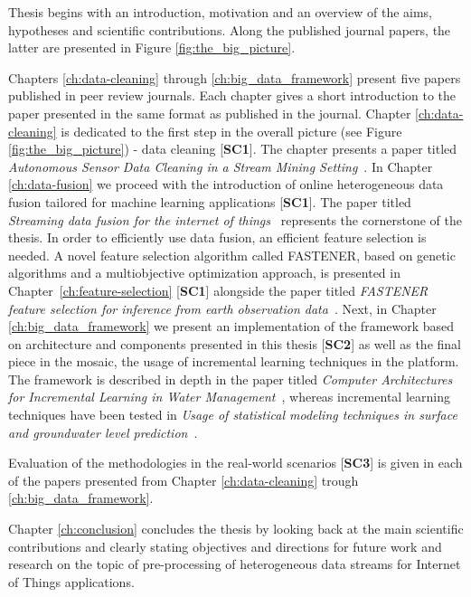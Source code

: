 Thesis begins with an introduction, motivation and an overview of the aims, hypotheses and scientific contributions.
Along the published journal papers, the latter are presented in Figure \ref{fig:the_big_picture}.

Chapters \ref{ch:data-cleaning} through \ref{ch:big_data_framework} present five papers published in peer review journals.
Each chapter gives a short introduction to the paper presented in the same format as published in the journal.
Chapter \ref{ch:data-cleaning} is dedicated to the first step in the overall picture (see Figure \ref{fig:the_big_picture}) - data cleaning [\textbf{SC1}]. The chapter presents a paper titled \textit{Autonomous Sensor Data Cleaning in a Stream Mining Setting}~\cite{kenda:2018:autonomous}.
In Chapter \ref{ch:data-fusion} we proceed with the introduction of online heterogeneous data fusion tailored for machine learning applications [\textbf{SC1}].
The paper titled \textit{Streaming data fusion for the internet of things}~\cite{kenda:2019:fusion} represents the cornerstone of the thesis.
In order to efficiently use data fusion, an efficient feature selection is needed.
A novel feature selection algorithm called FASTENER, based on genetic algorithms and a multiobjective optimization approach, is presented in Chapter~\ref{ch:feature-selection} [\textbf{SC1}] alongside the paper titled \textit{FASTENER feature selection for inference from earth observation data}~\cite{koprivec:2020:fastener}.
Next, in Chapter \ref{ch:big_data_framework} we present an implementation of the framework based on architecture and components presented in this thesis [\textbf{SC2}] as well as the final piece in the mosaic, the usage of incremental learning techniques in the platform.
The framework is described in depth in the paper titled \textit{Computer Architectures for Incremental Learning in Water Management}~\cite{kenda:2022:water-framework}, whereas incremental learning techniques have been tested in \textit{Usage of statistical modeling techniques in surface and groundwater level prediction}~\cite{kenda:2020:water-modeling}.

Evaluation of the methodologies in the real-world scenarios [\textbf{SC3}] is given in each of the papers presented from Chapter \ref{ch:data-cleaning} trough \ref{ch:big_data_framework}.

Chapter \ref{ch:conclusion} concludes the thesis by looking back at the main scientific contributions and clearly stating objectives and directions for future work and research on the topic of pre-processing of heterogeneous data streams for Internet of Things applications.
